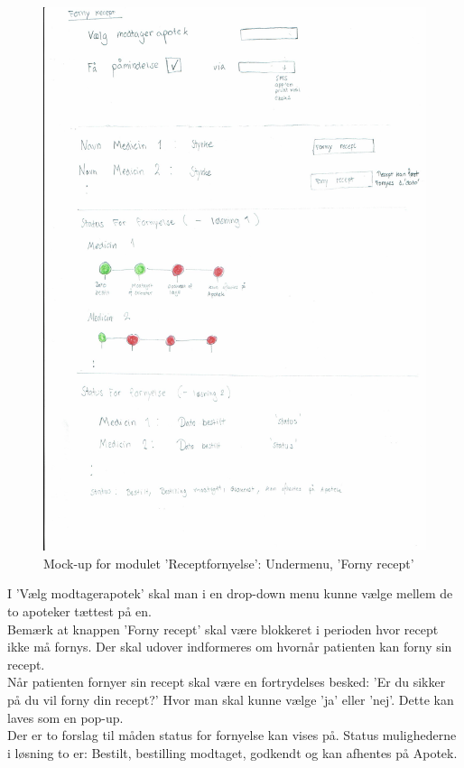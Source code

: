\begin{figure}[H]
	\centering
	\includegraphics[angle=0, height=0.85\textheight]{Materials/FornyRecept.pdf}
	\caption{Mock-up for modulet 'Receptfornyelse': Undermenu, 'Forny recept'}
	\label{fig:Mock-Up}
\end{figure}
I 'Vælg modtagerapotek' skal man i en drop-down menu kunne vælge mellem de to apoteker tættest på en.\\
Bemærk at knappen 'Forny recept' skal være blokkeret i perioden hvor recept ikke må fornys. Der skal udover indformeres om hvornår patienten kan forny sin recept.\\
Når patienten fornyer sin recept skal være en fortrydelses besked: 'Er du sikker på du vil forny din recept?' Hvor man skal kunne vælge 'ja' eller 'nej'. Dette kan laves som en pop-up. \\
Der er to forslag til måden status for fornyelse kan vises på. Status mulighederne i løsning to er: Bestilt, bestilling modtaget, godkendt og kan afhentes på Apotek.\\

